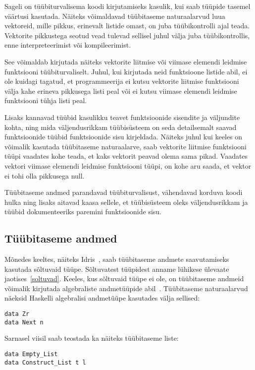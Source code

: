 \documentclass[12pt]{article}
\begin{document}
    Sageli on tüübiturvalisema koodi kirjutamiseks kasulik, kui saab tüüpide tasemel väärtusi kasutada. Näiteks võimaldavad tüübitaseme naturaalarvud luua vektoreid, mille pikkus, erinevalt listide omast, on juba tüübikontrolli ajal teada. Vektorite pikkustega seotud vead tulevad sellisel juhul välja juba tüübikontrollis, enne interpreteerimist või kompileerimist.

    See võimaldab kirjutada näiteks vektorite liitmise või viimase elemendi leidmise funktsiooni tüübiturvaliselt. Juhul, kui kirjutada neid funktsioone listide abil, ei ole kuidagi tagatud, et programmeerija ei kutsu vektorite liitmise funktsiooni välja kahe erineva pikkusega listi peal või ei kutsu viimase elemendi leidmise funktsiooni tühja listi peal.

    Lisaks kannavad tüübid kasulikku teavet funktsioonide sisendite ja väljundite kohta, ning mida väljendusrikkam tüübisüsteem on seda detailsemalt saavad funktsioonide tüübid funktsioonide sisu kirjeldada. Näiteks juhul kui keeles on võimalik kasutada tüübitaseme naturaalarve, saab vektorite liitmise funktsiooni tüüpi vaadates kohe teada, et kaks vektorit peavad olema sama pikad. Vaadates vektori viimase elemendi leidmise funktsiooni tüüpi, on kohe aru saada, et vektor ei tohi olla pikkusega null.

    Tüübitaseme andmed parandavad tüübiturvalisust, vähendavad korduva koodi hulka ning lisaks aitavad kaasa sellele, et tüübisüsteem oleks väljendusrikkam ja tüübid dokumenteeriks paremini funktsioonide sisu.
    \subsection{Tüübitaseme andmed}\label{tyybitasemeandmed}
      Mõnedes keeltes, näiteks Idris~\cite{The_Idr}, saab tüübitaseme andmete saavutamiseks kasutada sõltuvaid tüüpe. Sõltuvatest tüüpidest anname lühikese ülevaate jaotises~\ref{soltuvad}. Keeles, kus sõltuvaid tüüpe ei ole, on tüübitaseme andmeid võimalik kirjutada algebraliste andmetüüpide abil~\cite{Giv}. Tüübitaseme naturaalarvud näeksid Haskelli algebralisi andmetüüpe kasutades välja sellised:

      \begin{verbatim}data Zr
data Next n\end{verbatim}

      Sarnasel viisil saab teostada ka näiteks tüübitaseme liste:

      \begin{verbatim}data Empty_List
data Construct_List t l\end{verbatim}
\end{document}
